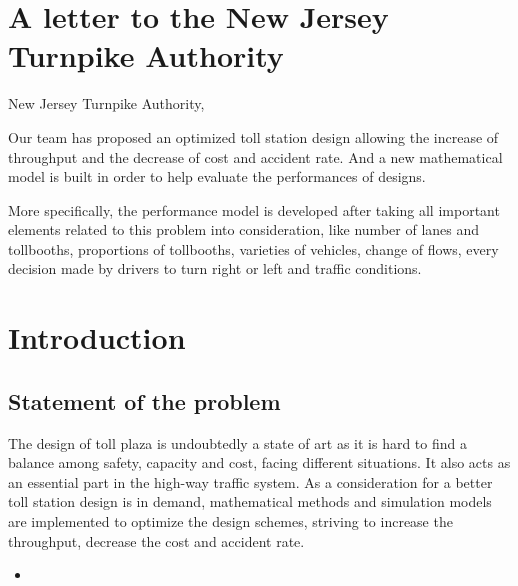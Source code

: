 \documentclass{mcmthesis}
\begin{document}
\section{A letter to the New Jersey Turnpike Authority}


New Jersey Turnpike Authority,

Our team has proposed an optimized toll station design allowing the increase of throughput and the decrease of cost and accident rate. And a new mathematical model is built in order to help evaluate the performances of designs. 

More specifically, the performance model is developed after taking all important elements related to this problem into consideration, like number of lanes and tollbooths, proportions of tollbooths, varieties of vehicles, change of flows, every decision made by drivers to turn right or left and traffic conditions. 



\section{Introduction}

\subsection{Statement of the problem}

The design of toll plaza is undoubtedly a state of art as it is hard to find a balance among safety, capacity and cost, facing different situations. It also acts as an essential part in the high-way traffic system. As a consideration for a better toll station design is in demand, mathematical methods and simulation models are implemented to optimize the design schemes, striving to increase the throughput, decrease the cost and accident rate.



\begin{itemize}

\item 
\end{itemize}







\begin{Theorem} \label{thm:latex}

\end{Theorem}

\begin{Lemma} \label{thm:tex}

\end{Lemma}
\end{document}
